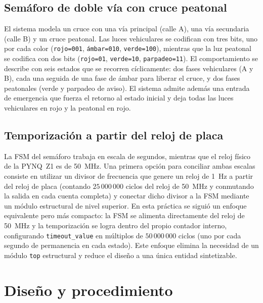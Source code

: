\documentclass[12pt,letterpaper]{article}
\begin{document}
\subsection{Semáforo de doble vía con cruce peatonal}
El sistema modela un cruce con una vía principal (calle A), una vía secundaria (calle B) y un cruce peatonal. Las luces vehiculares se codifican con tres bits, uno por cada color (\texttt{rojo=001}, \texttt{ámbar=010}, \texttt{verde=100}), mientras que la luz peatonal se codifica con dos bits (\texttt{rojo=01}, \texttt{verde=10}, \texttt{parpadeo=11}). El comportamiento se describe con seis estados que se recorren cíclicamente: dos fases vehiculares (A y B), cada una seguida de una fase de ámbar para liberar el cruce, y dos fases peatonales (verde y parpadeo de aviso). El sistema admite además una entrada de emergencia que fuerza el retorno al estado inicial y deja todas las luces vehiculares en rojo y la peatonal en rojo.

\subsection{Temporización a partir del reloj de placa}
La FSM del semáforo trabaja en escala de segundos, mientras que el reloj físico de la PYNQ~Z1 es de \SI{50}{\mega\hertz}. Una primera opción para conciliar ambas escalas consiste en utilizar un divisor de frecuencia que genere un reloj de \SI{1}{\hertz} a partir del reloj de placa (contando $25\,000\,000$ ciclos del reloj de \SI{50}{\mega\hertz} y conmutando la salida en cada cuenta completa) y conectar dicho divisor a la FSM mediante un módulo estructural de nivel superior. En esta práctica se siguió un enfoque equivalente pero más compacto: la FSM se alimenta directamente del reloj de \SI{50}{\mega\hertz} y la temporización se logra dentro del propio contador interno, configurando \texttt{timeout\_value} en múltiplos de $50\,000\,000$ ciclos (uno por cada segundo de permanencia en cada estado). Este enfoque elimina la necesidad de un módulo \texttt{top} estructural y reduce el diseño a una única entidad sintetizable.

\section{Diseño y procedimiento}
\end{document}
